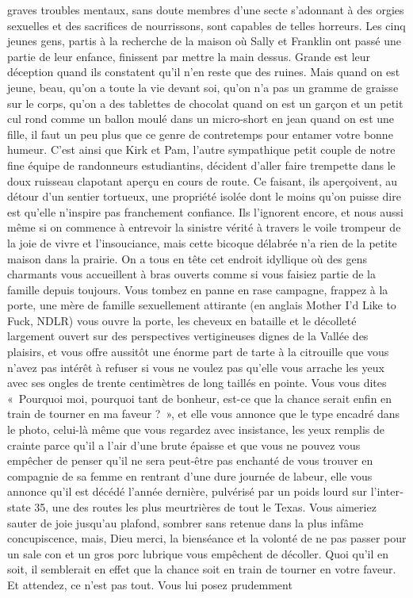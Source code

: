 graves troubles mentaux, sans doute membres d’une secte s’adonnant à des orgies sexuelles et des sacrifices de nourrissons, sont capables de telles horreurs. Les cinq jeunes gens, partis à la recherche de la maison où Sally et Franklin ont passé une partie de leur enfance, finissent par mettre la main dessus. Grande est leur déception quand ils constatent qu’il n’en reste que des ruines. Mais quand on est jeune, beau, qu’on a toute la vie devant soi, qu’on n’a pas un gramme de graisse sur le corps, qu’on a des tablettes de chocolat quand on est un garçon et un petit cul rond comme un ballon moulé dans un micro-short en jean quand on est une fille, il faut un peu plus que ce genre de contretemps pour entamer votre bonne humeur. C’est ainsi que Kirk et Pam, l’autre sympathique petit couple de notre fine équipe de randonneurs estudiantins, décident d’aller faire trempette dans le doux ruisseau clapotant aperçu en cours de route. Ce faisant, ils aperçoivent, au détour d’un sentier tortueux, une propriété isolée dont le moins qu’on puisse dire est qu’elle n’inspire pas franchement confiance. Ils l’ignorent encore, et nous aussi même si on commence à entrevoir la sinistre vérité à travers le voile trompeur de la joie de vivre et l’insouciance, mais cette bicoque délabrée n’a rien de la petite maison dans la prairie. On a tous en tête cet endroit idyllique où des gens charmants vous accueillent à bras ouverts comme si vous faisiez partie de la famille depuis toujours. Vous tombez en panne en rase campagne, frappez à la porte, une mère de famille sexuellement attirante (en anglais \foreignlanguage{english}{Mother I’d Like to Fuck}, NDLR) vous ouvre la porte, les cheveux en bataille et le décolleté largement ouvert sur des perspectives vertigineuses dignes de la Vallée des plaisirs, et vous offre aussitôt une énorme part de tarte à la citrouille que vous n’avez pas intérêt à refuser si vous ne voulez pas qu’elle vous arrache les yeux avec ses ongles de trente centimètres de long taillés en pointe. Vous vous dites «~Pourquoi moi, pourquoi tant de bonheur, est-ce que la chance serait enfin en train de tourner en ma faveur ?~», et elle vous annonce que le type encadré dans le photo, celui-là même que vous regardez avec insistance, les yeux remplis de crainte parce qu’il a l’air d’une brute épaisse et que vous ne pouvez vous empêcher de penser qu’il ne sera peut-être pas enchanté de vous trouver en compagnie de sa femme en rentrant d’une dure journée de labeur, elle vous annonce qu’il est décédé l’année dernière, pulvérisé par un poids lourd sur l’\foreignlanguage{english}{interstate} 35, une des routes les plus meurtrières de tout le Texas. Vous aimeriez sauter de joie jusqu’au plafond, sombrer sans retenue dans la plus infâme concupiscence, mais, Dieu merci, la bienséance et la volonté de ne pas passer pour un sale con et un gros porc lubrique vous empêchent de décoller. Quoi qu’il en soit, il semblerait en effet que la chance soit en train de tourner en votre faveur. Et attendez, ce n’est pas tout. Vous lui posez prudemment 